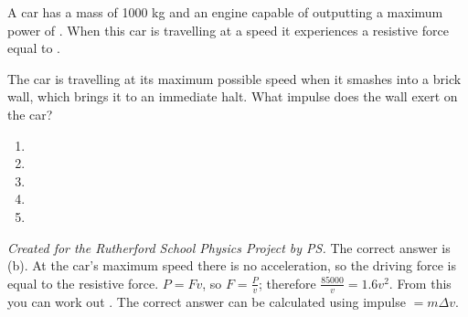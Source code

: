 \begin{problem}
{A car has a mass of 1000 kg and an engine capable of outputting a maximum power of . When this car is travelling at a speed  it experiences a resistive force equal to .

The car is travelling at its maximum possible speed when it smashes into a brick wall, which brings it to an immediate halt. What impulse does the wall exert on the car?
\begin{enumerate}
	\item {}
	\item {}
	\item {} 
	\item {}
	\item {}
\end{enumerate}
}
{\textit{Created for the Rutherford School Physics Project by PS.}}
{The correct answer is (b). At the car's maximum speed there is no acceleration, so the driving force is equal to the resistive force. $P = Fv$, so $F = \frac{P}{v}$; therefore $\frac{85000}{v} = 1.6v^{2}$. From this you can work out . The correct answer can be calculated using impulse $= m\Delta v$.
}
\end{problem}

